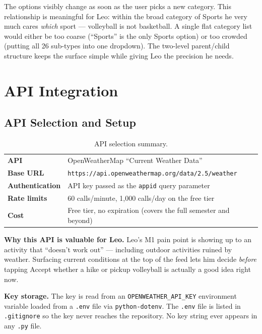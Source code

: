 \documentclass[11pt]{article}
\begin{document}
The options visibly change as soon as the user picks a new category. This relationship is meaningful for Leo: within the broad category of Sports he very much cares \textit{which} sport --- volleyball is not basketball. A single flat category list would either be too coarse (``Sports'' is the only Sports option) or too crowded (putting all 26 sub-types into one dropdown). The two-level parent/child structure keeps the surface simple while giving Leo the precision he needs.

\section{API Integration}

\subsection{API Selection and Setup}

\begin{table}[h!]
\centering
\begin{tabularx}{\textwidth}{>{\bfseries}l X}
\toprule
API & OpenWeatherMap ``Current Weather Data'' \\
Base URL & \texttt{https://api.openweathermap.org/data/2.5/weather} \\
Authentication & API key passed as the \texttt{appid} query parameter \\
Rate limits & 60 calls/minute, 1{,}000 calls/day on the free tier \\
Cost & Free tier, no expiration (covers the full semester and beyond) \\
\bottomrule
\end{tabularx}
\caption{API selection summary.}
\end{table}

\textbf{Why this API is valuable for Leo.} Leo's M1 pain point is showing up to an activity that ``doesn't work out'' --- including outdoor activities ruined by weather. Surfacing current conditions at the top of the feed lets him decide \textit{before} tapping Accept whether a hike or pickup volleyball is actually a good idea right now.

\textbf{Key storage.} The key is read from an \texttt{OPENWEATHER\_API\_KEY} environment variable loaded from a \texttt{.env} file via \texttt{python-dotenv}. The \texttt{.env} file is listed in \texttt{.gitignore} so the key never reaches the repository. No key string ever appears in any \texttt{.py} file.
\end{document}
